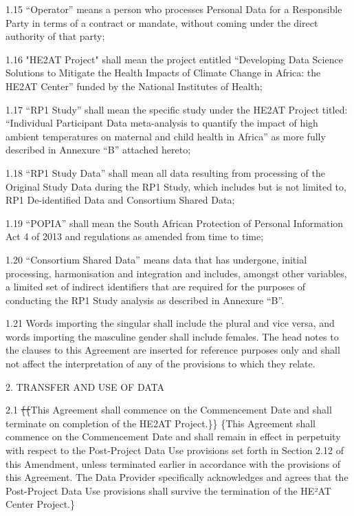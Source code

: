 \documentclass[12pt,letterpaper]{article}
\newcommand{\deleted}[1]{\textcolor{deletecolor}{\sout{#1}}}
\newcommand{\added}[1]{\textcolor{addcolor}{#1}}
\begin{document}
1.15	“Operator” means a person who processes Personal Data for a Responsible Party in terms of a contract or mandate, without coming under the direct authority of that party;

1.16	"HE2AT Project" shall mean the project entitled “Developing Data Science Solutions to Mitigate the Health Impacts of Climate Change in Africa: the HE2AT Center” funded by the National Institutes of Health;

1.17	“RP1 Study” shall mean the specific study under the HE2AT Project titled: “Individual Participant Data meta-analysis to quantify the impact of high ambient temperatures on maternal and child health in Africa” as more fully described in Annexure “B” attached hereto;

1.18	“RP1 Study Data” shall mean all data resulting from processing of the Original Study Data during the RP1 Study, which includes but is not limited to, RP1 De-identified Data and Consortium Shared Data;  

1.19	“POPIA” shall mean the South African Protection of Personal Information Act 4 of 2013 and regulations as amended from time to time;

1.20	“Consortium Shared Data” means data that has undergone, initial processing, harmonisation and integration and includes, amongst other variables, a limited set of indirect identifiers that are required for the purposes of conducting the RP1 Study analysis as described in Annexure “B”.  

1.21	Words importing the singular shall include the plural and vice versa, and words importing the masculine gender shall include females. The head notes to the clauses to this Agreement are inserted for reference purposes only and shall not affect the interpretation of any of the provisions to which they relate.

2.	TRANSFER AND USE OF DATA

2.1	\deleted\{\deleted\{This Agreement shall commence on the Commencement Date and shall terminate on completion of the HE2AT Project.\}\} \added\{This Agreement shall commence on the Commencement Date and shall remain in effect in perpetuity with respect to the Post-Project Data Use provisions set forth in Section 2.12 of this Amendment, unless terminated earlier in accordance with the provisions of this Agreement. The Data Provider specifically acknowledges and agrees that the Post-Project Data Use provisions shall survive the termination of the HE²AT Center Project.\}
\end{document}
